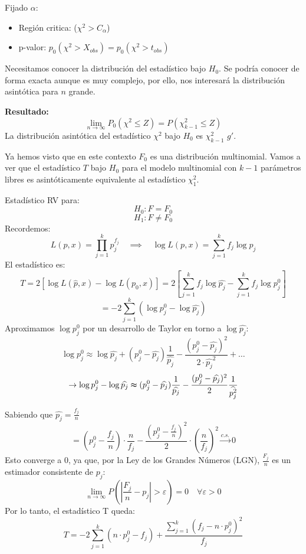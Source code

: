 \vspace{5mm}

\noindent Fijado $\alpha$:
\begin{itemize}
    \item Región critica: ($\chi^2 > C_\alpha$)
    \item p-valor: $p_0(\chi^2>X_{obs})=p_0(\chi^2>t_{obs})$
\end{itemize}

Necesitamos conocer la distribución del estadístico bajo $H_0$.
Se podría conocer de forma exacta aunque es muy complejo, por ello, nos interesará la distribución asintótica para $n$ grande.

\smallskip

\noindent \textbf{Resultado:}
\[
    \lim_{n \to \infty} P_0(\chi^2 \leq Z)=P(\chi^2_{k-1} \leq Z)
\]
La distribución asintótica del estadístico $\chi^2$ bajo $H_0$ es $\chi^2_{k-1}$ $g'$.

Ya hemos visto que en este contexto $ F_0 $ es una distribución multinomial. 
Vamos a ver que el estadístico $ T $ bajo $ H_0 $ para el modelo multinomial con $ k-1 $ parámetros libres es asintóticamente equivalente al estadístico $ \chi^2_1 $.

\begin{proofs}
    Estadístico RV para:
    \[
        H_0: F = F_0
    \]
    \[
        H_1: F \neq F_0
    \]
    Recordemos:
    \[
        L(p, x) = \prod_{j=1}^{k} p_j^{f_j} \quad \implies \quad \log L(p, x) = \sum_{j=1}^{k} f_j \log p_j
    \]
    El estadístico es:
    \[
        T = 2 \left[\log L(\widehat{p}, x) - \log L(p_0, x)\right] = 2 \left[ \sum_{j=1}^{k} f_j \log \widehat{p_j} - \sum_{j=1}^{k} f_j \log p_j^0 \right] 
    \]
    \[
        = -2 \sum_{j=1}^{k} \left( \log p_j^0 - \log \widehat{p_j} \right)
    \]
    Aproximamos $\log p_j^0$ por un desarrollo de Taylor en torno a $\log \widehat{p_j}$:
    \[
        \log p_j^0 \approx \log \widehat{p_j} + (p_j^0 - \widehat{p_j}) \frac{1}{\widehat{p_j}} - \frac{(p_j^0 - \widehat{p_j})^2}{2 \cdot \widehat{p_j}^2}+ \dots
    \]
    \[
        \to \log p_j^0- \log \widehat{p_j}\thickapprox (p^0_j-\widehat{p_j}) \frac{1}{\widehat{p_j}}- \frac{(p^0_j-\widehat{p_j})^2}{2}\frac{1}{\widehat{p_j^2}}
    \]

    Sabiendo que $\widehat{p_j}=\frac{f_j}{n}$
    \[
        =\left(p_j^0-\frac{f_j}{n}\right) \cdot \frac{n}{f_j} - \frac{\left(p_j^0-\frac{f_j}{n}\right)^2}{2}\cdot \left(\frac{n}{f_j}\right)^2 \xrightarrow{c.s.} 0
    \]
    Esto converge a 0, ya que, por la Ley de los Grandes Números (LGN), $\frac{F_j}{n}$ es un estimador consistente de $p_j$:
    \[
        \lim_{n \to \infty} P \left( \left| \frac{F_j}{n} - p_j \right| > \varepsilon \right) = 0 \quad \forall \varepsilon>0
    \]
    Por lo tanto, el estadístico T queda:
    \[
        T = -2 \sum_{j=1}^{k} \left( n \cdot p_j^0 - f_j \right) + \frac{\sum_{j=1}^{k} (f_j - n \cdot p_j^0)^2}{f_j}
    \]
\end{proofs}

